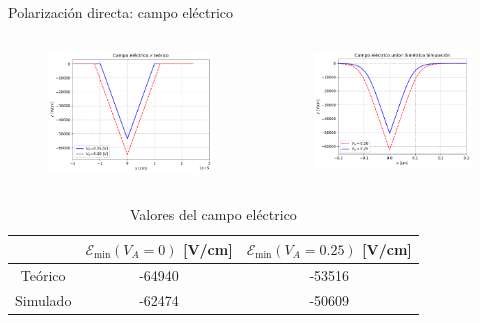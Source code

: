 \documentclass[aspectratio=169,xcolor=dvipsnames]{beamer}
\begin{document}
\begin{frame}{Polarización directa: campo eléctrico}    \begin{columns}
    \begin{column}{0.5\textwidth}
        \begin{figure}
            \includegraphics[width=0.90\linewidth]{Teorico/Campo_Electrico-Directa.pdf}
        \end{figure}
    \end{column}
    \begin{column}{0.5\textwidth}
        \begin{figure}
            \includegraphics[width=0.90\linewidth]{Directa/Campo_Electrico-Directa.pdf}
        \end{figure}
    \end{column}
    \end{columns}
    \begin{table}
        \caption{Valores del campo eléctrico}
        \begin{tabular}{c|cc}
            & $\mathcal{E}_{\min} (V_A=0)$ [V/cm] & $\mathcal{E}_{\min} (V_A=0.25)$ [V/cm]   \\ \hline
            Teórico & -64940 & -53516 \\
            Simulado & -62474 & -50609
        \end{tabular}
    \end{table}
\end{frame}
\end{document}
